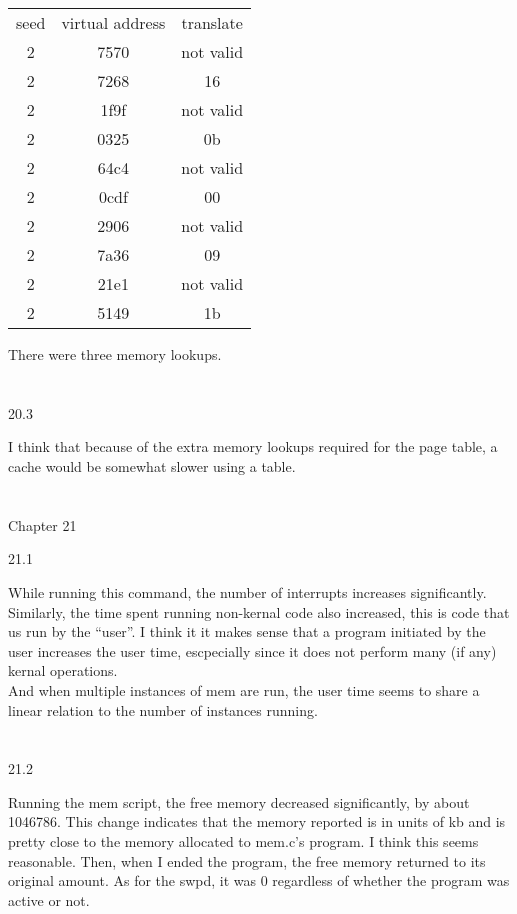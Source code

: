 \documentclass[12pt, a4paper]{article}
\begin{document}
		 \begin{center}
		\begin{tabular}{||c c c||} 
 		\hline
		 seed & virtual address & translate \\ [0.5ex]
		 2 & 7570 & not valid \\
		 2 & 7268 &16 \\
		 2 & 1f9f & not valid \\
		 2 & 0325 &0b \\
		 2 & 64c4 & not valid \\
		 2 & 0cdf & 00 \\
		 2 & 2906 &not valid \\
		 2 & 7a36 & 09 \\
		 2 & 21e1 & not valid\\
		 2 & 5149 &1b \\
		 \hline
		\end{tabular}
		\end{center}
		
		There were three memory lookups.\\ \\ \\
	
	
	20.3
	
	I think that because of the extra memory lookups required for the page table, a cache would be somewhat slower using a table. \\ \\ \\
	
\noindent
Chapter 21

	21.1
	
		While running this command, the number of interrupts increases significantly. Similarly, the time spent running non-kernal code also increased, this is code that us run by the ``user''. I think it it makes sense that a program initiated by the user increases the user time, escpecially since it does not perform many (if any) kernal operations. \\ 
		And when multiple instances of mem are run, the user time seems to share a linear relation to the number of instances running. \\ \\ \\
	
	21.2
	
		Running the mem script, the free memory decreased significantly, by about 1046786. This change indicates that the memory reported is in units of kb and is pretty close to the memory allocated to mem.c's program. I think this seems reasonable. Then, when I ended the program, the free memory returned to its original amount.  As for the swpd, it was 0 regardless of whether the program was active or not. \\ \\ \\
	
\end{document}
